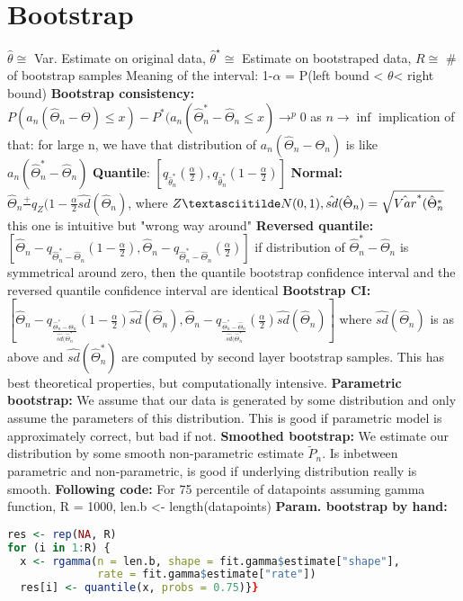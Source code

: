 \section{Bootstrap}
$\hat{\theta} \cong$ Var. Estimate on original data, $\hat{\theta}^\star \cong$ Estimate on bootstraped data, $R \cong$ \# of bootstrap samples
Meaning of the interval: 1-$\alpha$ = P(left bound < $\theta $< right bound)
\textbf{Bootstrap consistency: }$P(a_n(\hat\Theta_n-\Theta) \leq x)-P^*(a_n(\hat\Theta_n^*-\hat\Theta_n \leq x) \rightarrow^p 0$ as $n \rightarrow \inf$ implication of that: for large n, we have that distribution of $a_n(\hat\Theta_n - \Theta_n)$ is like $a_n(\hat\Theta^*_n- \hat\Theta_n)$
\textbf{Quantile}: $[q_{\hat\theta_n^*}(\frac{\alpha}{2}),q_{\hat\theta_n^*}(1-\frac{\alpha}{2})]$
\textbf{Normal: }$\hat\Theta_n \frac{+}{} q_Z(1-\frac{\alpha}{2}\hat{sd}(\hat\Theta_n)$, where $Z \textasciitilde N(0,1), \hat{sd}(\hat \Theta_n) = \sqrt{\hat{Var}^*(\hat{\Theta}_n^*}$ this one is intuitive but "wrong way around"
\textbf{Reversed quantile: } $[\hat\Theta_n - q_{\hat\Theta_n^*-\hat\Theta_n}(1-\frac{\alpha}{2}), \hat\Theta_n - q_{\hat\Theta_n^*-\hat\Theta_n}(\frac{\alpha}{2})]$  if distribution of $\hat \Theta_n^*- \hat \Theta_n$ is symmetrical around zero, then the quantile bootstrap confidence interval and the reversed quantile confidence interval are identical 
\textbf{Bootstrap CI: }$[\hat\Theta_n - q_{\frac{\hat\Theta_n^*-\hat\Theta_n}{\hat{sd}(\hat\Theta_n^*}}(1-\frac{\alpha}{2})\hat{sd}(\hat\Theta_n), \hat\Theta_n - q_{\frac{\hat\Theta_n^*-\hat\Theta_n}{\hat{sd}(\hat\Theta_n^*}}(\frac{\alpha}{2})\hat{sd}(\hat\Theta_n)]$ where $\hat{sd}(\hat\Theta_n)$ is as above and $\hat{sd}(\hat\Theta_n^*)$ are computed by second layer bootstrap samples. This has best theoretical properties, but computationally intensive. 
\textbf{Parametric bootstrap: } We assume that our data is generated by some distribution and only assume the parameters of this distribution. This is good if parametric model is approximately correct, but bad if not. 
\textbf{Smoothed bootstrap: } We estimate our distribution by some smooth non-parametric estimate $\tilde P_n$. Is inbetween parametric and non-parametric, is good if underlying distribution really is smooth. 
\textbf{Following code:} For 75 percentile of datapoints assuming gamma function, R = 1000, len.b <- length(datapoints)
\textbf{Param. bootstrap by hand:}
\begin{lstlisting}[language=R]
res <- rep(NA, R)
for (i in 1:R) {
  x <- rgamma(n = len.b, shape = fit.gamma$estimate["shape"],
              rate = fit.gamma$estimate["rate"])
  res[i] <- quantile(x, probs = 0.75)}}
\end{lstlisting}
